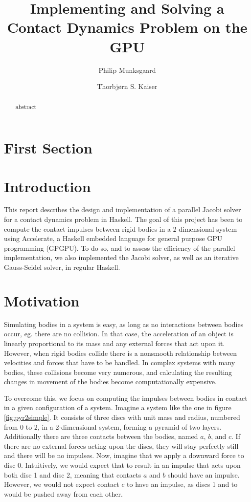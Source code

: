 \documentclass[runningheads,a4paper]{llncs}
\title{Implementing and Solving a Contact Dynamics Problem on the GPU}
\author{Philip Munksgaard \and Thorbjørn S. Kaiser}
\institute{
    University of Copenhagen Department of Computer Science (DIKU), \\
    Nørre Campus, Universitetsparken 5, DK-2100 Copenhagen Ø, Denmark
}
\begin{document}
\mainmatter
\maketitle

\begin{abstract}
abstract
\end{abstract}

\section{First Section}
\section{Introduction}

This report describes the design and implementation of a parallel Jacobi solver
for a contact dynamics problem in Haskell. The goal of this project has been to
compute the contact impulses between rigid bodies in a 2-dimensional system
using Accelerate, a Haskell embedded language for general purpose GPU
programming (GPGPU). To do so, and to assess the efficiency of the parallel
implementation, we also implemented the Jacobi solver, as well as an iterative
Gauss-Seidel solver, in regular Haskell.


\section{Motivation}

Simulating bodies in a system is easy, as long as no interactions between
bodies occur, eg. there are no collision. In that case, the acceleration of an
object is linearly proportional to its mass and any external forces that act
upon it. However, when rigid bodies collide there is a nonsmooth relationship
between velocities and forces that have to be handled. In complex systems with
many bodies, these collisions become very numerous, and calculating the
resulting changes in movement of the bodies become computationally expensive.


To overcome this, we focus on computing the impulses between bodies in contact
in a given configuration of a system. Imagine a system like the one in figure
\ref{fig:pyr2simple}. It consists of three discs with unit mass and radius,
numbered from 0 to 2, in a 2-dimensional system, forming a pyramid of two
layers. Additionally there are three contacts between the bodies, named $a$,
$b$, and $c$. If there are no external forces acting upon the discs, they will
stay perfectly still and there will be no impulses. Now, imagine that we apply
a downward force to disc 0. Intuitively, we would expect that to result in an
impulse that acts upon both disc 1 and disc 2, meaning that contacts $a$ and
$b$ should have an impulse. However, we would not expect contact $c$ to have an
impulse, as discs 1 and to would be pushed away from each other.
\end{document}
